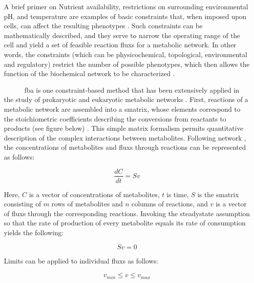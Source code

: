 \begin{pabox}[label=trends:box:fba]{A brief primer on }
Nutrient availability, restrictions on surrounding 
environmental pH, and temperature are examples of basic 
constraints that, when imposed upon cells, can affect 
the resulting phenotypes \cite{Lee:2006je}. Such constraints can 
be mathematically described, and they serve to narrow 
the operating range of the cell and yield a set of feasible 
reaction \glspl{flux} for a metabolic network. In other words, 
the constraints (which can be physicochemical, 
topological, environmental and regulatory) restrict 
the number of possible phenotypes, which then allows 
the function of the biochemical network to be 
characterized \cite{Lee:2006je,Price:2004hx}.

~~~~~~\gls{fba} is one constraint-based 
method that has been extensively applied in the study 
of prokaryotic and eukaryotic metabolic networks \cite{Oberhardt:2008fr,Duarte:2007iu}. 
First, reactions of a metabolic network are assembled 
into a \gls{smatrix}, whose elements 
correspond to the stoichiometric coefficients describing 
the conversions from reactants to products (see figure below) \cite{Thiele:2010fr,Lee:2006je}. 
This simple matrix formalism permits quantitative 
description of the complex interactions between metabolites. 
Following network , the concentrations of 
metabolites and \glspl{flux} through reactions can be represented 
as follows:

\begin{equation} \label{trends:eq:massbalance}
\frac{dC}{dt} = S v
\end{equation}

Here, $C$ is a vector of concentrations of metabolites, $t$ is 
time, $S$ is the \gls{smatrix} consisting of $m$ rows 
of metabolites and $n$ columns of reactions, and $v$ is a 
vector of \glspl{flux} through the corresponding reactions. 
Invoking the \gls{steadystate} assumption so that the rate 
of production of every metabolite equals its rate of 
consumption yields the following:

\begin{equation} \label{trends:eq:steadystate}
Sv = 0
\end{equation}

Limits can be applied to individual \glspl{flux} as follows:

\begin{equation*}
v_{min} \leq v \leq v_{max}
\end{equation*}


\end{pabox}
